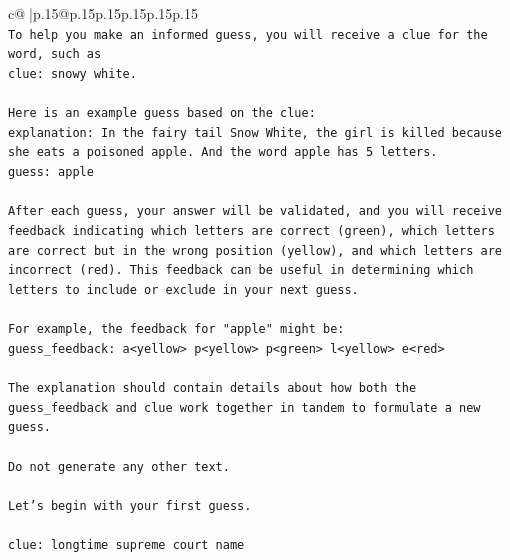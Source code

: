 \documentclass{article}
\begin{document}
{\begin{supertabular}{c@{$\;$}|p{.15\linewidth}@{}p{.15\linewidth}p{.15\linewidth}p{.15\linewidth}p{.15\linewidth}p{.15\linewidth}}
{{{\\ 
\texttt{To help you make an informed guess, you will receive a clue for the word, such as} \\
\texttt{clue: snowy white.} \\
\\ 
\texttt{Here is an example guess based on the clue:} \\
\texttt{explanation: In the fairy tail Snow White, the girl is killed because she eats a poisoned apple. And the word apple has 5 letters.} \\
\texttt{guess: apple} \\
\\ 
\texttt{After each guess, your answer will be validated, and you will receive feedback indicating which letters are correct (green), which letters are correct but in the wrong position (yellow), and which letters are incorrect (red). This feedback can be useful in determining which letters to include or exclude in your next guess.} \\
\\ 
\texttt{For example, the feedback for "apple" might be:} \\
\texttt{guess\_feedback: a<yellow> p<yellow> p<green> l<yellow> e<red>} \\
\\ 
\texttt{The explanation should contain details about how both the guess\_feedback and clue work together in tandem to formulate a new guess.} \\
\\ 
\texttt{Do not generate any other text.} \\
\\ 
\texttt{Let's begin with your first guess.} \\
\\ 
\texttt{clue: longtime supreme court name} \\
            }
        }
    }
     \\ \\


\end{supertabular}}
\end{document}
